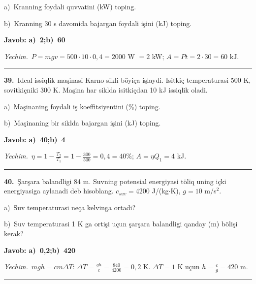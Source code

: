 \documentclass[11pt,a4paper]{article}
\begin{document}
\noindent\hspace*{4mm}a)\ Kranning foydali quvvatini (kW) toping.\par
\noindent\hspace*{4mm}b)\ Kranning 30 s davomida bajargan foydali işini (kJ) toping.\par
\noindent\colorbox{gray!12}{\parbox{\dimexpr\linewidth-2\fboxsep}{\textbf{Javob: a)\ 2;\quad b)\ 60}}}\par\smallskip
\noindent\textit{Yechim.}\ $P=mgv=500\cdot10\cdot0{,}4=2000$ W $=2$ kW; $A=Pt=2\cdot30=60$ kJ.\par\par\medskip\hrule\medskip
{}\noindent\textbf{39.}\ Ideal issiqlik maşinasi Karno sikli böyiça işlaydi. Isitkiç temperaturasi 500 K, sovitkiçniki 300 K. Maşina har siklda isitkiçdan 10 kJ issiqlik oladi.\par
\noindent\hspace*{4mm}a)\ Maşinaning foydali iş koeffitsiyentini (\%) toping.\par
\noindent\hspace*{4mm}b)\ Maşinaning bir siklda bajargan işini (kJ) toping.\par
\noindent\colorbox{gray!12}{\parbox{\dimexpr\linewidth-2\fboxsep}{\textbf{Javob: a)\ 40;\quad b)\ 4}}}\par\smallskip
\noindent\textit{Yechim.}\ $\eta=1-\frac{T_2}{T_1}=1-\frac{300}{500}=0{,}4=40\%$; $A=\eta Q_1=4$ kJ.\par\par\medskip\hrule\medskip
{}\noindent\textbf{40.}\ Şarşara balandligi 84 m. Suvning potensial energiyasi töliq uning içki energiyasiga aylanadi deb hisoblang. $c_{suv}=4200$ J/(kg$\cdot$K), $g=10$ m/s$^2$.\par
\noindent\hspace*{4mm}a)\ Suv temperaturasi neça kelvinga ortadi?\par
\noindent\hspace*{4mm}b)\ Suv temperaturasi 1 K ga ortişi uçun şarşara balandligi qanday (m) bölişi kerak?\par
\noindent\colorbox{gray!12}{\parbox{\dimexpr\linewidth-2\fboxsep}{\textbf{Javob: a)\ 0,2;\quad b)\ 420}}}\par\smallskip
\noindent\textit{Yechim.}\ $mgh=cm\Delta T$: $\Delta T=\frac{gh}{c}=\frac{840}{4200}=0{,}2$ K. $\Delta T=1$ K uçun $h=\frac{c}{g}=420$ m.\par\par\medskip\hrule\medskip
\end{document}
